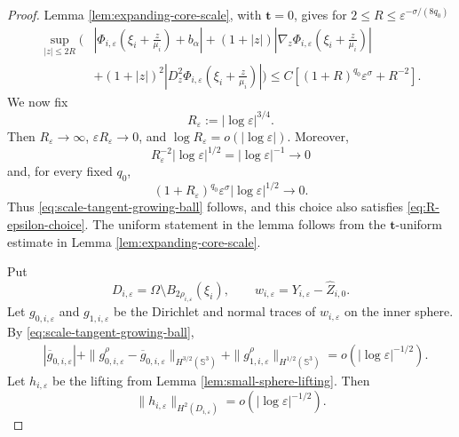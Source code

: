 \documentclass[11pt]{article}
\numberwithin{equation}{section}
\begin{document}
\begin{proof}
Lemma \ref{lem:expanding-core-scale}, with
$\boldsymbol t=0$, gives for $2\leq R\leq
\varepsilon^{-\sigma/(8q_0)}$
\[
\begin{aligned}
\sup_{|z|\leq2R}\Bigg(&
\left|\Phi_{i,\varepsilon}
\left(\xi_i+\frac z{\mu_i}\right)+b_\alpha\right|
+(1+|z|)\left|\nabla_z\Phi_{i,\varepsilon}
\left(\xi_i+\frac z{\mu_i}\right)\right|\\
&+(1+|z|)^2\left|D_z^2\Phi_{i,\varepsilon}
\left(\xi_i+\frac z{\mu_i}\right)\right|
\Bigg)
\leq C\left[(1+R)^{q_0}\varepsilon^\sigma+R^{-2}\right].
\end{aligned}
\]
We now fix
\begin{equation}\label{eq:diagonal-radius-rate}
R_\varepsilon:=|\log\varepsilon|^{3/4}.
\end{equation}
Then $R_\varepsilon\to\infty$,
$\varepsilon R_\varepsilon\to0$, and
$\log R_\varepsilon=o(|\log\varepsilon|)$. Moreover,
\[
R_\varepsilon^{-2}|\log\varepsilon|^{1/2}
=|\log\varepsilon|^{-1}\to0
\]
and, for every fixed $q_0$,
\[
(1+R_\varepsilon)^{q_0}\varepsilon^\sigma
|\log\varepsilon|^{1/2}\to0.
\]
Thus \eqref{eq:scale-tangent-growing-ball} follows, and this choice
also satisfies \eqref{eq:R-epsilon-choice}. The uniform statement in
the lemma follows from the $\boldsymbol t$-uniform estimate in Lemma
\ref{lem:expanding-core-scale}.

Put
\[
D_{i,\varepsilon}
=\Omega\setminus B_{2\rho_{i,\varepsilon}}(\xi_i),
\qquad
w_{i,\varepsilon}
=Y_{i,\varepsilon}-\widehat Z_{i,0}.
\]
Let $g_{0,i,\varepsilon}$ and $g_{1,i,\varepsilon}$ be the Dirichlet
and normal traces of $w_{i,\varepsilon}$ on the inner sphere. By
\eqref{eq:scale-tangent-growing-ball},
\begin{equation*}
\begin{aligned}
&|\overline g_{0,i,\varepsilon}|
+\|g_{0,i,\varepsilon}^{\rho}-
\overline g_{0,i,\varepsilon}\|_{H^{3/2}(\mathbb S^3)}
+\|g_{1,i,\varepsilon}^{\rho}\|_{H^{1/2}(\mathbb S^3)}
=o(|\log\varepsilon|^{-1/2}).
\end{aligned}
\end{equation*}
Let $h_{i,\varepsilon}$ be the lifting from Lemma
\ref{lem:small-sphere-lifting}. Then
\begin{equation}\label{eq:scale-tangent-boundary-lifting}
\|h_{i,\varepsilon}\|_{H^2(D_{i,\varepsilon})}
=o(|\log\varepsilon|^{-1/2}).
\end{equation}


\end{proof}
\end{document}

